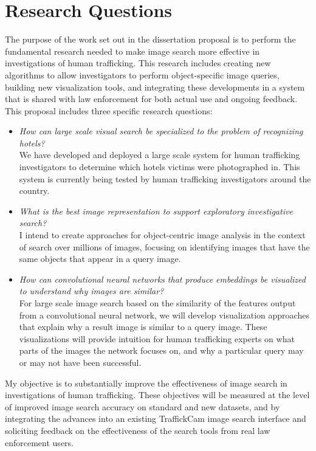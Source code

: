 \documentclass[12pt]{article}
\begin{document}
\section{Research Questions}
The purpose of the work set out in the dissertation proposal is to perform the fundamental research needed to make image search more effective in investigations of human trafficking.  This research includes creating new algorithms to allow investigators to perform object-specific image queries, building new visualization tools, and integrating these developments in a system that is shared with law enforcement for both actual use and ongoing feedback. This proposal includes three specific research questions:

\begin{itemize}
    \setlength\itemsep{.1em}
    \item \emph{How can large scale visual search be specialized to the problem of recognizing hotels?}\\
    We have developed and deployed a large scale system for human trafficking investigators to determine which hotels victims were photographed in. This system is currently being tested by human trafficking investigators around the country.
    \item \emph{What is the best image representation to support exploratory investigative search?} \\
    I intend to create approaches for object-centric image analysis in the context of search over millions of images, focusing on identifying images that have the same objects that appear in a query image.
    \item \emph{How can convolutional neural networks that produce embeddings be visualized to understand why images are similar?} \\
    For large scale image search based on the similarity of the features output from a convolutional neural network, we will develop visualization approaches that explain why a result image is similar to a query image. These visualizations will provide intuition for human trafficking experts on what parts of the images the network focuses on, and why a particular query may or may not have been successful.
\end{itemize}

My objective is to substantially improve the effectiveness of image search in investigations of human trafficking.  These objectives will be measured at the level of improved image search accuracy on standard and new datasets, and by integrating the advances into an existing TraffickCam image search interface and soliciting feedback on the effectiveness of the search tools from real law enforcement users.
\end{document}
